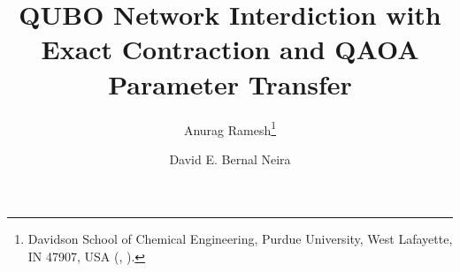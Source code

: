 \usepackage{amsfonts}
\usepackage{amssymb}
\usepackage{amsopn}
\usepackage{booktabs}
\usepackage{graphicx}
\usepackage{tabularx}
\title{QUBO Network Interdiction with Exact Contraction and QAOA Parameter Transfer}
\author{Anurag Ramesh\thanks{Davidson School of Chemical Engineering,
Purdue University, West Lafayette, IN 47907, USA
(, ).}
\and David E. Bernal Neira\footnotemark[1]}
\DeclareMathOperator*{\argmin}{arg\,min}
\DeclareMathOperator{\MF}{MF}
\newcommand{\E}{\mathbb{E}}
\newcommand{\bits}{\{0,1\}}
\newcommand{\ket}[1]{\lvert #1\rangle}
\newcommand{\code}[1]{\texttt{\detokenize{#1}}}
